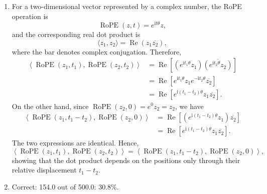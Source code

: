 \documentclass[11pt, a4paper, oneside]{article}
\begin{document}
\begin{enumerate}[label=(\alph*), left=0pt, labelsep=1em, itemsep=1em]
\begin{enumerate}[label=\roman*., left=0pt, labelsep=1em, itemsep=1em]
        \item
        For a two-dimensional vector represented by a complex number, the
        RoPE operation is
        \[
            \operatorname{RoPE}(z,t)=e^{\mathrm{i}t\theta}z,
        \]
        and the corresponding real dot product is
        \[
            \langle z_1,z_2\rangle
            =\operatorname{Re}\!\left(z_1\overline{z_2}\right),
        \]
        where the bar denotes complex conjugation. Therefore,
        \begin{align*}
            \left\langle \operatorname{RoPE}(z_1,t_1),
            \operatorname{RoPE}(z_2,t_2)\right\rangle
            &=\operatorname{Re}\!\left[
                \left(e^{\mathrm{i}t_1\theta}z_1\right)
                \overline{\left(e^{\mathrm{i}t_2\theta}z_2\right)}
              \right]\\
            &=\operatorname{Re}\!\left[
                e^{\mathrm{i}t_1\theta}z_1
                e^{-\mathrm{i}t_2\theta}\overline{z_2}
              \right]\\
            &=\operatorname{Re}\!\left[
                e^{\mathrm{i}(t_1-t_2)\theta}z_1\overline{z_2}
              \right].
        \end{align*}
        On the other hand, since
        $\operatorname{RoPE}(z_2,0)=e^{0}z_2=z_2$, we have
        \begin{align*}
            \left\langle \operatorname{RoPE}(z_1,t_1-t_2),
            \operatorname{RoPE}(z_2,0)\right\rangle
            &=\operatorname{Re}\!\left[
                \left(e^{\mathrm{i}(t_1-t_2)\theta}z_1\right)
                \overline{z_2}
              \right]\\
            &=\operatorname{Re}\!\left[
                e^{\mathrm{i}(t_1-t_2)\theta}z_1\overline{z_2}
              \right].
        \end{align*}
        The two expressions are identical. Hence,
        \[
            \left\langle \operatorname{RoPE}(z_1,t_1),
            \operatorname{RoPE}(z_2,t_2)\right\rangle
            =
            \left\langle \operatorname{RoPE}(z_1,t_1-t_2),
            \operatorname{RoPE}(z_2,0)\right\rangle,
        \]
        showing that the dot product depends on the positions only through
        their relative displacement $t_1-t_2$.
        \item Correct: 154.0 out of 500.0: 30.8\%.
    \end{enumerate}
\end{enumerate}
\end{document}
